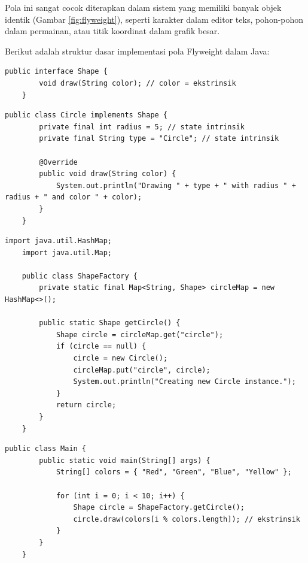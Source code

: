 Pola ini sangat cocok diterapkan dalam sistem yang memiliki banyak objek identik (Gambar \ref{fig:flyweight}), seperti karakter dalam editor teks, pohon-pohon dalam permainan, atau titik koordinat dalam grafik besar.

Berikut adalah struktur dasar implementasi pola Flyweight dalam Java:

\begin{lstlisting}[style=JavaStyle, caption={Flyweight: Shape}, label={lst:flyweight-shape}]
	public interface Shape {
		void draw(String color); // color = ekstrinsik
	}
\end{lstlisting}

\begin{lstlisting}[style=JavaStyle, caption={Flyweight Konkret: Circle}, label={lst:flyweight-circle}]
	public class Circle implements Shape {
		private final int radius = 5; // state intrinsik
		private final String type = "Circle"; // state intrinsik
		
		@Override
		public void draw(String color) {
			System.out.println("Drawing " + type + " with radius " + radius + " and color " + color);
		}
	}
\end{lstlisting}

\begin{lstlisting}[style=JavaStyle, caption={Flyweight Factory: ShapeFactory}, label={lst:flyweight-factory}]
	import java.util.HashMap;
	import java.util.Map;
	
	public class ShapeFactory {
		private static final Map<String, Shape> circleMap = new HashMap<>();
		
		public static Shape getCircle() {
			Shape circle = circleMap.get("circle");
			if (circle == null) {
				circle = new Circle();
				circleMap.put("circle", circle);
				System.out.println("Creating new Circle instance.");
			}
			return circle;
		}
	}
\end{lstlisting}

\begin{lstlisting}[style=JavaStyle, caption={Client: Menggunakan Flyweight}, label={lst:flyweight-main}]
	public class Main {
		public static void main(String[] args) {
			String[] colors = { "Red", "Green", "Blue", "Yellow" };
			
			for (int i = 0; i < 10; i++) {
				Shape circle = ShapeFactory.getCircle();
				circle.draw(colors[i % colors.length]); // ekstrinsik
			}
		}
	}
\end{lstlisting}

